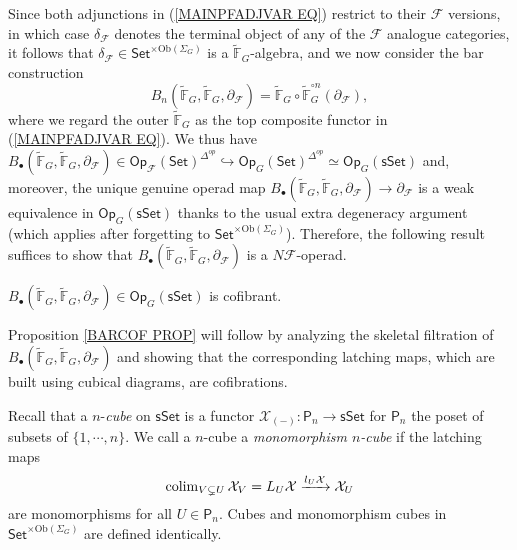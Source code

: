 \documentclass[a4paper,10pt]{article}%
\begin{document}
Since both adjunctions in 
(\ref{MAINPFADJVAR EQ})
restrict to their $\mathcal{F}$ versions,
in which case $\delta_{\mathcal{F}}$ denotes the terminal object of any of the $\mathcal{F}$ analogue categories,
it follows that 
$\delta_{\mathcal{F}} \in \mathsf{Set}^{\times \text{Ob}(\Sigma_G)}$
is a 
$\widetilde{\mathbb{F}}_G$-algebra, 
and we now consider the bar construction
\[B_n(\widetilde{\mathbb{F}}_G,
\widetilde{\mathbb{F}}_G,
\partial_{\mathcal{F}})
= \widetilde{\mathbb{F}}_G \circ
\widetilde{\mathbb{F}}_G ^{\circ n} 
(\partial_{\mathcal{F}}),
\]
where we regard the outer $\widetilde{\mathbb{F}}_G$ as the top composite functor in (\ref{MAINPFADJVAR EQ}).
We thus have
$B_{\bullet}(\widetilde{\mathbb{F}}_G,
\widetilde{\mathbb{F}}_G,
\partial_{\mathcal{F}})
\in
\mathsf{Op}_{\mathcal{F}}(\mathsf{Set})^{\Delta^{op}}
	\hookrightarrow
\mathsf{Op}_G(\mathsf{Set})^{\Delta^{op}}
\simeq \mathsf{Op}_G(\mathsf{sSet})$
and, moreover, the unique genuine operad map
$B_{\bullet}(\widetilde{\mathbb{F}}_G,
\widetilde{\mathbb{F}}_G,
\partial_{\mathcal{F}})
\to 
\partial_{\mathcal{F}}$
is a weak equivalence in 
$\mathsf{Op}_G(\mathsf{sSet})$
thanks to the usual extra degeneracy argument
\cite[\S 4.5]{Ri14}
(which applies after forgetting to 
$\mathsf{Set}^{\times \text{Ob}(\Sigma_G)}$).
Therefore, 
the following result suffices to show that
$B_{\bullet}(\widetilde{\mathbb{F}}_G,
\widetilde{\mathbb{F}}_G,
\partial_{\mathcal{F}})
$
is a $N \mathcal{F}$-operad.

\begin{proposition}\label{BARCOF PROP}
$B_{\bullet}(\widetilde{\mathbb{F}}_G,
\widetilde{\mathbb{F}}_G,
\partial_{\mathcal{F}})
\in \mathsf{Op}_G(\mathsf{sSet})
$
is cofibrant.
\end{proposition}

Proposition \ref{BARCOF PROP}
will follow by analyzing the skeletal filtration of
$B_{\bullet}(\widetilde{\mathbb{F}}_G,
\widetilde{\mathbb{F}}_G,
\partial_{\mathcal{F}})
$ and showing that the corresponding latching maps,
which are built using cubical diagrams, are cofibrations.

Recall that a $n$-\textit{cube} on $\mathsf{sSet}$
is a functor
$\mathcal{X}_{(\minus)} \colon \mathsf{P}_n \to 
\mathsf{sSet}$
for $\mathsf{P}_n$ the poset of subsets of 
$\{1,\cdots,n\}$.
We call a $n$-cube a \textit{monomorphism $n$-cube}
if the latching maps
\[
\operatorname{colim}_{V \subsetneq U} \mathcal{X}_V = L_U \mathcal{X}
\xrightarrow{l_U \mathcal{X}} 
\mathcal{X}_U
\]
are monomorphisms for all $U \in \mathsf{P}_n$.
Cubes and monomorphism cubes in
$\mathsf{Set}^{\times \text{Ob}(\Sigma_G)}$
are defined identically.
\end{document}
